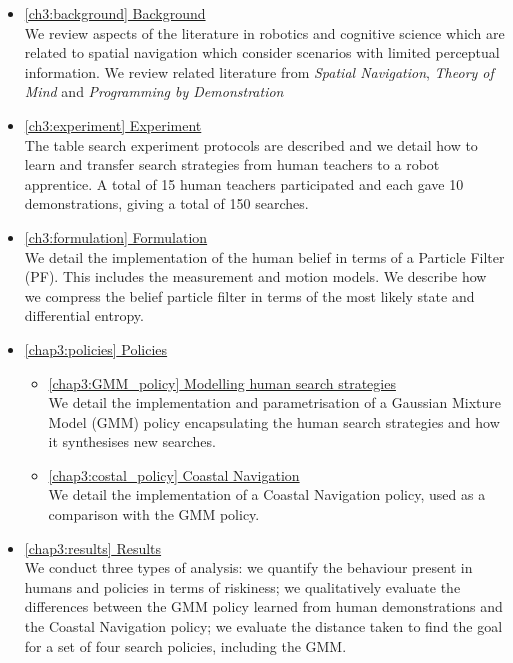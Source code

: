 \begin{itemize}

\item  \hyperref[ch3:background]{\ref{ch3:background}   Background}\\
We review aspects of the literature in robotics and cognitive science which are related to spatial navigation which 
consider scenarios with limited perceptual information. We review related literature from \textit{Spatial Navigation}, 
\textit{Theory of Mind} and \textit{Programming by Demonstration}

\item  \hyperref[ch3:experiment]{\ref{ch3:experiment}   Experiment}\\
The table search experiment protocols are described and we detail how to learn and transfer search strategies from human teachers to a robot 
apprentice. A total of 15 human teachers participated and each gave 10 demonstrations, giving a total of 150 searches.

\item  \hyperref[ch3:formulation]{\ref{ch3:formulation}  Formulation}\\
We detail the implementation of the human belief in terms of a Particle Filter (PF). This includes the measurement and motion 
models. We describe how we compress the belief particle filter in terms of the most likely state and differential entropy.

\item  \hyperref[chap3:policies]{\ref{chap3:policies} 	Policies}
\begin{itemize}
  \item \hyperref[chap3:GMM_policy]{\ref{chap3:GMM_policy} Modelling human search strategies}\\
  We detail the implementation and parametrisation of a Gaussian Mixture Model (GMM) policy encapsulating
the human search strategies and how it synthesises new searches.
  \item \hyperref[chap3:costal_policy]{\ref{chap3:costal_policy} Coastal Navigation}\\
  We detail the implementation of a Coastal Navigation policy, used as a comparison with the GMM policy.
\end{itemize}

\item  \hyperref[chap3:results]{\ref{chap3:results} 	Results}\\
We conduct three types of analysis: we quantify the behaviour present in humans and policies in terms of riskiness; we 
qualitatively evaluate the differences between the GMM policy learned from human demonstrations and the Coastal Navigation policy;
we evaluate the distance taken to find the goal for a set of four search policies, including the GMM.

\end{itemize}

